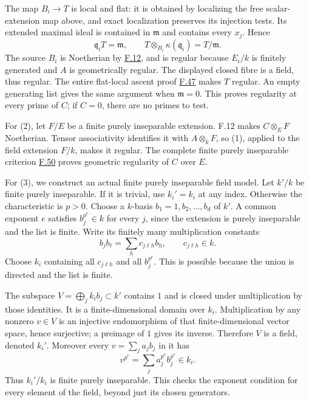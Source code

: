 \documentclass[11pt,a4paper,openany]{report}
\begin{document}
The map \(B_i\to T\) is local and flat: it is obtained by localizing the free scalar-extension map above, and exact localization preserves its injection tests. Its extended maximal ideal is contained in \(\mathfrak m\) and contains every \(x_j\). Hence \[\mathfrak q_iT=\mathfrak m,\qquad
T\otimes_{B_i}\kappa(\mathfrak q_i)=T/\mathfrak m.\] The source \(B_i\) is Noetherian by \hyperref[AG-RG-S05-algebra-lemma-Noetherian-field-extension]{F.12}, and is regular because \(E_i/k\) is finitely generated and \(A\) is geometrically regular. The displayed closed fibre is a field, thus regular. The entire flat-local ascent proof \hyperref[AG-RG-S05-algebra-lemma-flat-over-regular-with-regular-fibre]{F.47} makes \(T\) regular. An empty generating list gives the same argument when \(\mathfrak m=0\). This proves regularity at every prime of \(C\); if \(C=0\), there are no primes to test.

For (2), let \(F/E\) be a finite purely inseparable extension. F.12 makes \(C\otimes_EF\) Noetherian. Tensor associativity identifies it with \(A\otimes_kF\), so (1), applied to the field extension \(F/k\), makes it regular. The complete finite purely inseparable criterion \hyperref[AG-RG-S05-algebra-lemma-geometrically-regular]{F.50} proves geometric regularity of \(C\) over \(E\).

For (3), we construct an actual finite purely inseparable field model. Let \(k'/k\) be finite purely inseparable. If it is trivial, use \(k_i'=k_i\) at any index. Otherwise the characteristic is \(p>0\). Choose a \(k\)-basis \(b_1=1,b_2,\ldots,b_d\) of \(k'\). A common exponent \(e\) satisfies \(b_j^{p^e}\in k\) for every \(j\), since the extension is purely inseparable and the list is finite. Write its finitely many multiplication constants \[b_jb_\ell=\sum_h c_{j\ell h}b_h,\qquad c_{j\ell h}\in k.\] Choose \(k_i\) containing all \(c_{j\ell h}\) and all \(b_j^{p^e}\). This is possible because the union is directed and the list is finite.

The subspace \(V=\bigoplus_j k_i b_j\subset k'\) contains \(1\) and is closed under multiplication by those identities. It is a finite-dimensional domain over \(k_i\). Multiplication by any nonzero \(v\in V\) is an injective endomorphism of that finite-dimensional vector space, hence surjective; a preimage of \(1\) gives its inverse. Therefore \(V\) is a field, denoted \(k_i'\). Moreover every \(v=\sum_j a_jb_j\) in it has \[v^{p^e}=\sum_j a_j^{p^e}b_j^{p^e}\in k_i.\] Thus \(k_i'/k_i\) is finite purely inseparable. This checks the exponent condition for every element of the field, beyond just its chosen generators.
\end{document}
